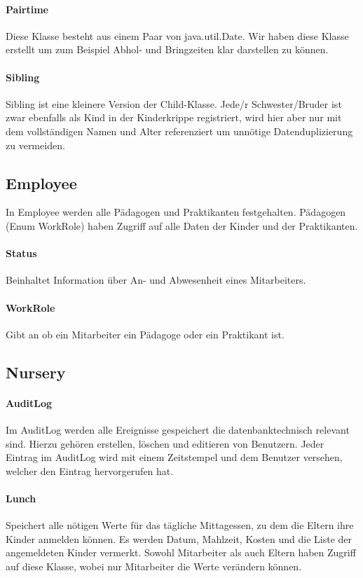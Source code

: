 \paragraph{Pairtime}
	Diese Klasse besteht aus einem Paar von java.util.Date. Wir haben diese Klasse erstellt um zum Beispiel Abhol- und Bringzeiten klar darstellen zu können. 
\paragraph{Sibling}
	Sibling ist eine kleinere Version der Child-Klasse. Jede/r Schwester/Bruder ist zwar ebenfalls als Kind in der Kinderkrippe registriert, wird hier aber nur mit dem vollständigen Namen und Alter referenziert um unnötige Datenduplizierung zu vermeiden. 

\subsection{Employee}
	In Employee werden alle Pädagogen und Praktikanten festgehalten. Pädagogen (Enum WorkRole) haben Zugriff auf alle Daten der Kinder und der Praktikanten. 
\paragraph{Status}
	Beinhaltet Information über An- und Abwesenheit eines Mitarbeiters. 
\paragraph{WorkRole}
	Gibt an ob ein Mitarbeiter ein Pädagoge oder ein Praktikant ist.
	
\subsection{Nursery}
\paragraph{AuditLog}
	Im AuditLog werden alle Ereignisse gespeichert die datenbanktechnisch relevant sind. Hierzu gehören erstellen, löschen und editieren von Benutzern. Jeder Eintrag im AuditLog wird mit einem Zeitstempel und dem Benutzer versehen, welcher den Eintrag hervorgerufen hat. 
\paragraph{Lunch}
	Speichert alle nötigen Werte für das tägliche Mittagessen, zu dem die Eltern ihre Kinder anmelden können. Es werden Datum, Mahlzeit, Kosten und die Liste der angemeldeten Kinder vermerkt. Sowohl Mitarbeiter als auch Eltern haben Zugriff auf diese Klasse, wobei nur Mitarbeiter die Werte verändern können.
